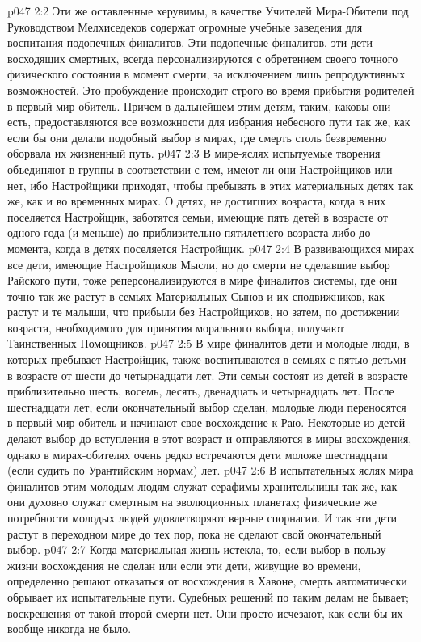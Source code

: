 \vs p047 2:2 Эти же оставленные херувимы, в качестве Учителей Мира\hyp{}Обители под Руководством Мелхиседеков содержат огромные учебные заведения для воспитания подопечных финалитов. Эти подопечные финалитов, эти дети восходящих смертных, всегда персонализируются с обретением своего точного физического состояния в момент смерти, за исключением лишь репродуктивных возможностей. Это пробуждение происходит строго во время прибытия родителей в первый мир\hyp{}обитель. Причем в дальнейшем этим детям, таким, каковы они есть, предоставляются все возможности для избрания небесного пути так же, как если бы они делали подобный выбор в мирах, где смерть столь безвременно оборвала их жизненный путь.
\vs p047 2:3 В мире\hyp{}яслях испытуемые творения объединяют в группы в соответствии с тем, имеют ли они Настройщиков или нет, ибо Настройщики приходят, чтобы пребывать в этих материальных детях так же, как и во временных мирах. О детях, не достигших возраста, когда в них поселяется Настройщик, заботятся семьи, имеющие пять детей в возрасте от одного года (и меньше) до приблизительно пятилетнего возраста либо до момента, когда в детях поселяется Настройщик.
\vs p047 2:4 В развивающихся мирах все дети, имеющие Настройщиков Мысли, но до смерти не сделавшие выбор Райского пути, тоже реперсонализируются в мире финалитов системы, где они точно так же растут в семьях Материальных Сынов и их сподвижников, как растут и те малыши, что прибыли без Настройщиков, но затем, по достижении возраста, необходимого для принятия морального выбора, получают Таинственных Помощников.
\vs p047 2:5 В мире финалитов дети и молодые люди, в которых пребывает Настройщик, также воспитываются в семьях с пятью детьми в возрасте от шести до четырнадцати лет. Эти семьи состоят из детей в возрасте приблизительно шесть, восемь, десять, двенадцать и четырнадцать лет. После шестнадцати лет, если окончательный выбор сделан, молодые люди переносятся в первый мир\hyp{}обитель и начинают свое восхождение к Раю. Некоторые из детей делают выбор до вступления в этот возраст и отправляются в миры восхождения, однако в мирах\hyp{}обителях очень редко встречаются дети моложе шестнадцати (если судить по Урантийским нормам) лет.
\vs p047 2:6 В испытательных яслях мира финалитов этим молодым людям служат серафимы\hyp{}хранительницы так же, как они духовно служат смертным на эволюционных планетах; физические же потребности молодых людей удовлетворяют верные спорнагии. И так эти дети растут в переходном мире до тех пор, пока не сделают свой окончательный выбор.
\vs p047 2:7 Когда материальная жизнь истекла, то, если выбор в пользу жизни восхождения не сделан или если эти дети, живущие во времени, определенно решают отказаться от восхождения в Хавоне, смерть автоматически обрывает их испытательные пути. Судебных решений по таким делам не бывает; воскрешения от такой второй смерти нет. Они просто исчезают, как если бы их вообще никогда не было.
